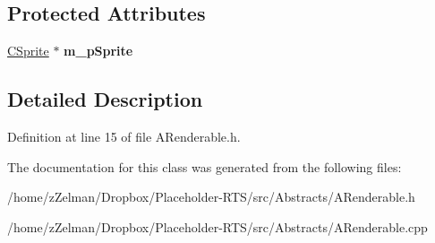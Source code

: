 \subsection*{Protected Attributes}
\begin{DoxyCompactItemize}
\item 
\hypertarget{classARenderable_a6030df923c81b400e94ff1f6a9df41f8}{\hyperlink{classCSprite}{C\-Sprite} $\ast$ {\bfseries m\-\_\-p\-Sprite}}\label{classARenderable_a6030df923c81b400e94ff1f6a9df41f8}

\end{DoxyCompactItemize}


\subsection{Detailed Description}


Definition at line 15 of file A\-Renderable.\-h.



The documentation for this class was generated from the following files\-:\begin{DoxyCompactItemize}
\item 
/home/z\-Zelman/\-Dropbox/\-Placeholder-\/\-R\-T\-S/src/\-Abstracts/A\-Renderable.\-h\item 
/home/z\-Zelman/\-Dropbox/\-Placeholder-\/\-R\-T\-S/src/\-Abstracts/A\-Renderable.\-cpp\end{DoxyCompactItemize}
